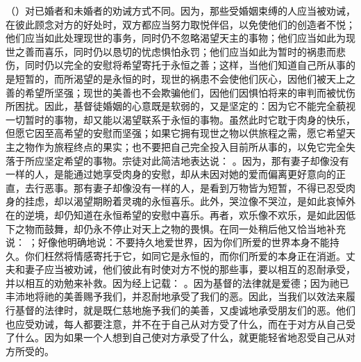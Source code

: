 （）对已婚者和未婚者的劝诫方式不同。因为，那些受婚姻束缚的人应当被劝诫，在彼此顾念对方的好处时，双方都应当努力取悦伴侣，以免使他们的创造者不悦；他们应当如此处理现世的事务，同时仍不忽略渴望天主的事物；他们应当如此为现世之善而喜乐，同时仍以恳切的忧虑惧怕永罚；他们应当如此为暂时的祸患而悲伤，同时仍以完全的安慰将希望寄托于永恒之善；这样，当他们知道自己所从事的是短暂的，而所渴望的是永恒的时，现世的祸患不会使他们灰心，因他们被天上之善的希望所坚强；现世的美善也不会欺骗他们，因他们因惧怕将来的审判而被忧伤所困扰。因此，基督徒婚姻的心意既是软弱的，又是坚定的：因为它不能完全藐视一切暂时的事物，却又能以渴望联系于永恒的事物。虽然此时它耽于肉身的快乐，但愿它因至高希望的安慰而坚强；如果它拥有现世之物以供旅程之需，愿它希望天主之物作为旅程终点的果实；也不要把自己完全投入目前所从事的，以免它完全失落于所应坚定希望的事物。宗徒对此简洁地表达说： 。因为，那有妻子却像没有一样的人，是能通过她享受肉身的安慰，却从未因对她的爱而偏离更好意向的正直，去行恶事。那有妻子却像没有一样的人，是看到万物皆为短暂，不得已忍受肉身的挂虑，却以渴望期盼着灵魂的永恒喜乐。此外，哭泣像不哭泣，是如此哀悼外在的逆境，却仍知道在永恒希望的安慰中喜乐。再者，欢乐像不欢乐，是如此因低下之物而鼓舞，却仍永不停止对天上之物的畏惧。在同一处稍后他又恰当地补充说： ；好像他明确地说：不要持久地爱世界，因为你们所爱的世界本身不能持久。你们枉然将情感寄托于它，如同它是永恒的，而你们所爱的本身正在消逝。丈夫和妻子应当被劝诫，他们彼此有时使对方不悦的那些事，要以相互的忍耐承受，并以相互的劝勉来补救。因为经上记载： 。因为基督的法律就是爱德；因为祂已丰沛地将祂的美善赐予我们，并忍耐地承受了我们的恶。因此，当我们以效法来履行基督的法律时，就是既仁慈地施予我们的美善，又虔诚地承受朋友们的恶。他们也应受劝诫，每人都要注意，并不在于自己从对方受了什么，而在于对方从自己受了什么。因为如果一个人想到自己使对方承受了什么，就更能轻省地忍受自己从对方所受的。\par

